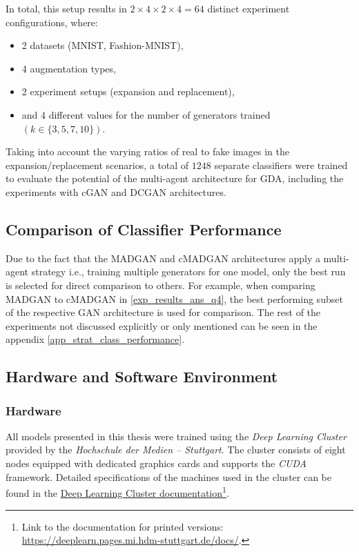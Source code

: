 \noindent In total, this setup results in \( 2 \times 4 \times 2 \times 4 = 64 \) distinct experiment configurations, where:
\begin{itemize} \label{list_number_of_classifiers}
    \item 2 datasets (MNIST, Fashion-MNIST),
    \item 4 augmentation types,
    \item 2 experiment setups (expansion and replacement),
    \item and 4 different values for the number of generators trained \((k \in \{3, 5, 7, 10\})\).
\end{itemize}
Taking into account the varying ratios of real to fake images in the expansion/replacement scenarios, a total of \(1248\) separate classifiers were trained to evaluate the potential of the multi-agent architecture for GDA, including the experiments with cGAN and DCGAN architectures.

\subsection{Comparison of Classifier Performance}
Due to the fact that the MADGAN and cMADGAN architectures apply a multi-agent strategy i.e., training multiple generators for one model, only the best run is selected for direct comparison to others. For example, when comparing MADGAN to cMADGAN in \ref{exp_results_ans_q4}, the best performing subset of the respective GAN architecture is used for comparison. The rest of the experiments not discussed explicitly or only mentioned can be seen in the appendix \ref{app_strat_class_performance}.

\subsection{Hardware and Software Environment}

\subsubsection{Hardware}
All models presented in this thesis were trained using the \textit{Deep Learning Cluster} provided by the \textit{Hochschule der Medien – Stuttgart}. The cluster consists of eight nodes equipped with dedicated graphics cards and supports the \textit{CUDA} framework. Detailed specifications of the machines used in the cluster can be found in the \href{https://deeplearn.pages.mi.hdm-stuttgart.de/docs/}{Deep Learning Cluster documentation}\footnote{Link to the documentation for printed versions: \url{https://deeplearn.pages.mi.hdm-stuttgart.de/docs/}.}.

